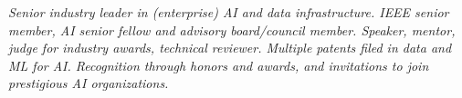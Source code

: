 {\selectfont
	\begin{justify}\textit{Senior industry leader in (enterprise) AI and data infrastructure. IEEE senior member, AI senior fellow and advisory board/council member. Speaker, mentor, judge for industry awards, technical reviewer. Multiple patents filed in data and ML for AI. Recognition through honors and awards, and invitations to join prestigious AI organizations.}\end{justify}
}